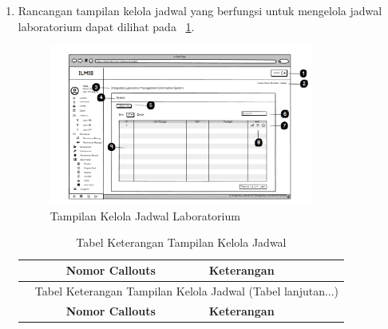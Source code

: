 \begin{enumerate}
	\item Rancangan tampilan kelola jadwal yang berfungsi untuk mengelola jadwal laboratorium dapat dilihat pada \pic~\ref{fig:kelola-jadwal}.
	      \begin{figure}
		      \centering
		      \includegraphics[width=0.82\textwidth]{konten/gambar/user interface/ui-jadwal.png}
		      \caption{Tampilan Kelola Jadwal Laboratorium}
		      \label{fig:kelola-jadwal}
	      \end{figure}

	      {
	      \fontsize{11}{13}\selectfont
	      \begin{longtable}{c p{}}
		      \caption{Tabel Keterangan Tampilan Kelola Jadwal}
		      \label{tab:ui-jadwal}                                                                                                 \\
		      \hline
		      \textbf{Nomor Callouts} & \textbf{Keterangan}                                                                         \\
		      \hline
		      \endfirsthead

		      \multicolumn{2}{c}{\small\tablename\ \thetable\ {Tabel Keterangan Tampilan Kelola Jadwal} \space (Tabel lanjutan...)} \\
		      \hline
		      \textbf{Nomor Callouts} & \textbf{Keterangan}                                                                         \\
		      \hline
		      \endhead


\end{longtable}}
\end{enumerate}
